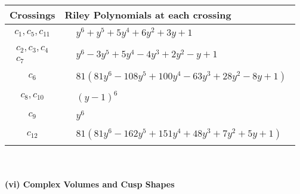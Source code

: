 \documentclass[1p]{elsarticle_modified}
\theoremstyle{definition}
\begin{document}
\begin{tabular}{m{50pt}|m{274pt}}
Crossings & \hspace{64pt}Riley Polynomials at each crossing \\
\hline $$\begin{aligned}c_{1},c_{5},c_{11}\end{aligned}$$&$\begin{aligned}
&y^6+y^5+5 y^4+6 y^2+3 y+1
\end{aligned}$\\
\hline $$\begin{aligned}c_{2},c_{3},c_{4}\\c_{7}\end{aligned}$$&$\begin{aligned}
&y^6-3 y^5+5 y^4-4 y^3+2 y^2- y+1
\end{aligned}$\\
\hline $$\begin{aligned}c_{6}\end{aligned}$$&$\begin{aligned}
&81(81 y^6-108 y^5+100 y^4-63 y^3+28 y^2-8 y+1)
\end{aligned}$\\
\hline $$\begin{aligned}c_{8},c_{10}\end{aligned}$$&$\begin{aligned}
&(y-1)^6
\end{aligned}$\\
\hline $$\begin{aligned}c_{9}\end{aligned}$$&$\begin{aligned}
&y^6
\end{aligned}$\\
\hline $$\begin{aligned}c_{12}\end{aligned}$$&$\begin{aligned}
&81(81 y^6-162 y^5+151 y^4+48 y^3+7 y^2+5 y+1)
\end{aligned}$\\
\hline
\end{tabular}\\~\\
\newpage\flushleft \textbf{(vi) Complex Volumes and Cusp Shapes}
\end{document}
